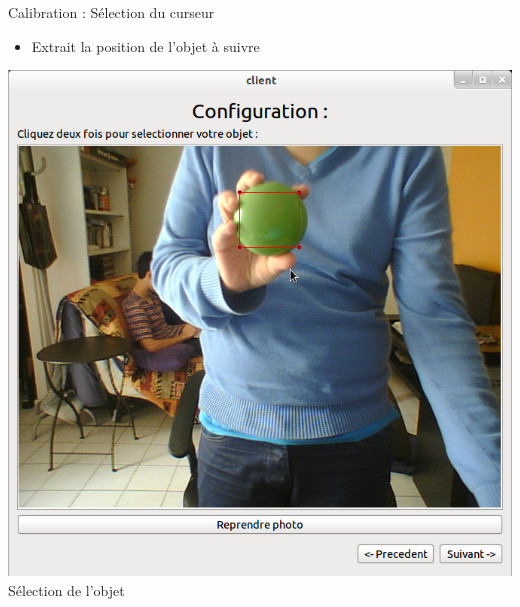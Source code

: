 \documentclass{beamer}
\begin{document}
            \begin{frame}{Calibration : Sélection du curseur}
                  \begin{itemize}
                        \item{Extrait la position de l'objet à suivre}
                  \end{itemize}
                  \begin{center}
                        \includegraphics[scale=0.25]{Capture1.png}\\
                        Sélection de l'objet
                  \end{center}
            
            \end{frame}
\end{document}
